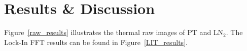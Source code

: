 \documentclass[]{spie}  %
\begin{document}
\section{Results \& Discussion} %
\label{sec:results_&_discussion}
Figure~\ref{raw_results} illustrates the thermal raw images of PT and LN$_2$. The Lock-In FFT results can be found in Figure~\ref{LIT_results}.
\begin{figure}[ht]
   \centering
   \hspace{10pt}
   \hspace{10pt}
\end{figure}
\end{document}

